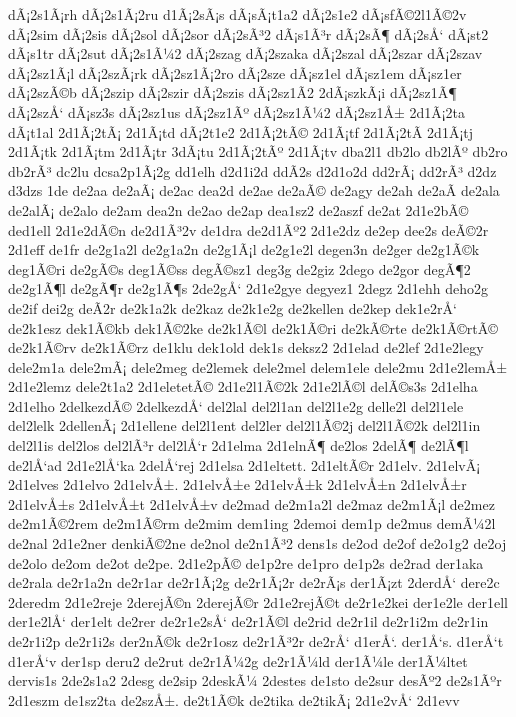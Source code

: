 {dÃ¡2s1Ã¡rh
dÃ¡2s1Ã¡2ru
d1Ã¡2sÃ¡s
dÃ¡sÃ¡t1a2
dÃ¡2s1e2
dÃ¡sfÃ©2l1Ã©2v
dÃ¡2sim
dÃ¡2sis
dÃ¡2sol
dÃ¡2sor
dÃ¡2sÃ³2
dÃ¡s1Ã³r
dÃ¡2sÃ¶
dÃ¡2sÅ‘
dÃ¡st2
dÃ¡s1tr
dÃ¡2sut
dÃ¡2s1Ã¼2
dÃ¡2szag
dÃ¡2szaka
dÃ¡2szal
dÃ¡2szar
dÃ¡2szav
dÃ¡2sz1Ã¡l
dÃ¡2szÃ¡rk
dÃ¡2sz1Ã¡2ro
dÃ¡2sze
dÃ¡sz1el
dÃ¡sz1em
dÃ¡sz1er
dÃ¡2szÃ©b
dÃ¡2szip
dÃ¡2szir
dÃ¡2szis
dÃ¡2sz1Ã­2
2dÃ¡szkÃ¡i
dÃ¡2sz1Ã¶
dÃ¡2szÅ‘
dÃ¡sz3s
dÃ¡2sz1us
dÃ¡2sz1Ãº
dÃ¡2sz1Ã¼2
dÃ¡2sz1Å±
2d1Ã¡2ta
dÃ¡t1al
2d1Ã¡2tÃ¡
2d1Ã¡td
dÃ¡2t1e2
2d1Ã¡2tÃ©
2d1Ã¡tf
2d1Ã¡2tÃ­
2d1Ã¡tj
2d1Ã¡tk
2d1Ã¡tm
2d1Ã¡tr
3dÃ¡tu
2d1Ã¡2tÃº
2d1Ã¡tv
dba2l1
db2lo
db2lÃº
db2ro
db2rÃ³
dc2lu
dcsa2p1Ã¡2g
dd1elh
d2d1i2d
ddÃ­2s
d2d1o2d
dd2rÃ¡
dd2rÃ³
d2dz
d3dzs
1de
de2aa
de2aÃ¡
de2ac
dea2d
de2ae
de2aÃ©
de2agy
de2ah
de2aÃ­
de2ala
de2alÃ¡
de2alo
de2am
dea2n
de2ao
de2ap
dea1sz2
de2aszf
de2at
2d1e2bÃ©
ded1ell
2d1e2dÃ©n
de2d1Ã³2v
de1dra
de2d1Ãº2
2d1e2dz
de2ep
dee2s
deÃ©2r
2d1eff
de1fr
de2g1a2l
de2g1a2n
de2g1Ã¡l
de2g1e2l
degen3n
de2ger
de2g1Ã©k
deg1Ã©ri
de2gÃ©s
deg1Ã©ss
degÃ©sz1
deg3g
de2giz
2dego
de2gor
degÃ¶2
de2g1Ã¶l
de2gÃ¶r
de2g1Ã¶s
2de2gÅ‘
2d1e2gye
degyez1
2degz
2d1ehh
deho2g
de2if
dei2g
deÃ­2r
de2k1a2k
de2kaz
de2k1e2g
de2kellen
de2kep
dek1e2rÅ‘
de2k1esz
dek1Ã©kb
dek1Ã©2ke
de2k1Ã©l
de2k1Ã©ri
de2kÃ©rte
de2k1Ã©rtÃ©
de2k1Ã©rv
de2k1Ã©rz
de1klu
dek1old
dek1s
deksz2
2d1elad
de2lef
2d1e2legy
dele2m1a
dele2mÃ¡
dele2meg
de2lemek
dele2mel
delem1ele
dele2mu
2d1e2lemÅ±
2d1e2lemz
dele2t1a2
2d1eletetÃ©
2d1e2l1Ã©2k
2d1e2lÃ©l
delÃ©s3s
2d1elha
2d1elho
2delkezdÃ©
2delkezdÅ‘
del2lal
del2l1an
del2l1e2g
delle2l
del2l1ele
del2lelk
2dellenÃ¡
2d1ellene
del2l1ent
del2ler
del2l1Ã©2j
del2l1Ã©2k
del2l1in
del2l1is
del2los
del2lÃ³r
del2lÅ‘r
2d1elma
2d1elnÃ¶
de2los
2delÃ¶
de2lÃ¶l
de2lÅ‘ad
2d1e2lÅ‘ka
2delÅ‘rej
2d1elsa
2d1eltett.
2d1eltÃ©r
2d1elv.
2d1elvÃ¡
2d1elves
2d1elvo
2d1elvÅ±.
2d1elvÅ±e
2d1elvÅ±k
2d1elvÅ±n
2d1elvÅ±r
2d1elvÅ±s
2d1elvÅ±t
2d1elvÅ±v
de2mad
de2m1a2l
de2maz
de2m1Ã¡l
de2mez
de2m1Ã©2rem
de2m1Ã©rm
de2mim
dem1ing
2demoi
dem1p
de2mus
demÃ¼2l
de2nal
2d1e2ner
denkiÃ©2ne
de2nol
de2n1Ã³2
dens1s
de2od
de2of
de2o1g2
de2oj
de2olo
de2om
de2ot
de2pe.
2d1e2pÃ©
de1p2re
de1pro
de1p2s
de2rad
der1aka
de2rala
de2r1a2n
de2r1ar
de2r1Ã¡2g
de2r1Ã¡2r
de2rÃ¡s
der1Ã¡zt
2derdÅ‘
dere2c
2deredm
2d1e2reje
2derejÃ©n
2derejÃ©r
2d1e2rejÃ©t
de2r1e2kei
der1e2le
der1ell
der1e2lÅ‘
der1elt
de2rer
de2r1e2sÅ‘
de2r1Ã©l
de2rid
de2r1il
de2r1i2m
de2r1in
de2r1i2p
de2r1i2s
der2nÃ©k
de2r1osz
de2r1Ã³2r
de2rÅ‘
d1erÅ‘.
der1Å‘s.
d1erÅ‘t
d1erÅ‘v
der1sp
deru2
de2rut
de2r1Ã¼2g
de2r1Ã¼ld
der1Ã¼le
der1Ã¼ltet
dervis1s
2de2s1a2
2desg
de2sip
2deskÃ¼
2destes
de1sto
de2sur
desÃº2
de2s1Ãºr
2d1eszm
de1sz2ta
de2szÅ±.
de2t1Ã©k
de2tika
de2tikÃ¡
2d1e2vÅ‘
2d1evv
}
